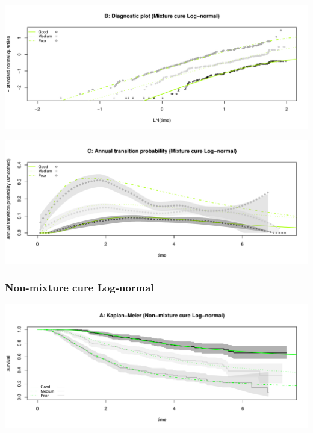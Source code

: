 \documentclass[
]{article}
\begin{document}
\begin{flushleft}\includegraphics[height=0.25\textheight]{BC_OS_output/Images/Figure_cure_models-8} \end{flushleft}

\begin{flushleft}\includegraphics[height=0.25\textheight]{BC_OS_output/Images/Figure_cure_models-9} \end{flushleft}

\clearpage

\subsubsection{Non-mixture cure
Log-normal}\label{non-mixture-cure-log-normal}

\begin{flushleft}\includegraphics[height=0.25\textheight]{BC_OS_output/Images/Figure_cure_models-10} \end{flushleft}
\end{document}
